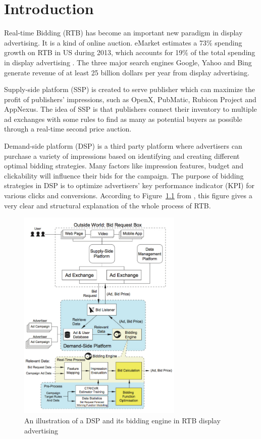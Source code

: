 \chapter{Introduction}
\label{chapterlabel1}

Real-time Bidding (RTB) has become an important new paradigm in display advertising. It is a kind of online auction. eMarket estimates a 73$\%$ spending growth on RTB in US during 2013, which accounts for 19$\%$ of the total spending in display advertising \cite{emarketer2013}. The three major search engines Google, Yahoo and Bing generate revenue of at least 25 billion dollars per year from display advertising.

Supply-side platform (SSP) is created to serve publisher which can maximize the profit of publishers' impressions, such as OpenX, PubMatic, Rubicon Project and AppNexus. The idea of SSP is that publishers connect their inventory to multiple ad exchanges with some rules to find as many as potential buyers as possible through a real-time second price auction. 

Demand-side platform (DSP) is a third party platform where advertisers can purchase a variety of impressions based on identifying and creating different optimal bidding strategies. Many factors like impression features, budget and clickability will influence their bids for the campaign. The purpose of bidding strategies in DSP is to optimize advertisers' key performance indicator (KPI) for various clicks and conversions. According to Figure~\ref{fig:RTB} from \cite{Zhang:2014:ORB:2623330.2623633}, this figure gives a very clear and structural explanation of the whole process of RTB.

\begin{figure}[htbp]
\centering
\includegraphics[width=0.70\textwidth]{RTB.pdf}
\caption{An illustration of a DSP and its bidding engine in RTB display advertising}
\label{fig:RTB}
\end{figure}

